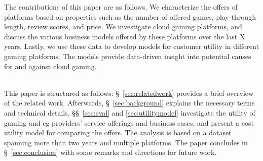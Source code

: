 
The contributions of this paper are as follows.
We characterize the offers of platforms based on properties such
as the number of offered games, play-through length, review scores,
and price.
We investigate cloud gaming platforms, and discuss the various
business models offered by these platforms over the last X years.
Lastly, we use these data to develop models for customer utility
in different gaming platforms. The models provide data-driven
insight into potential causes for and against cloud gaming.


~\\
This paper is structured as follows: §~\ref{sec:relatedwork} provides a
brief overview of the related work. Afterwards, §~\ref{sec:background}
explains the necessary terms and technical details.
§§~\ref{sec:eval} and \ref{sec:utilitymodel} investigate the utility of
gaming and \gls{cg} providers' service offerings and business cases,
and present a cost utility model for comparing the offers.
The analysis is based on a dataset spanning more than two years and
multiple platforms.
The paper concludes in §~\ref{sec:conclusion} with some
remarks and directions for future work.



